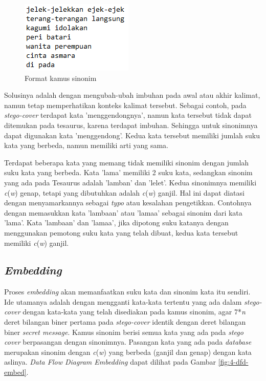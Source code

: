 \begin{figure}[H]
	\centering
	\includegraphics[scale=0.8]{Gambar/format-kamus}
	\caption{Format kamus sinonim} 
	\label{fig:6-format-kamus}
\end{figure}

Solusinya adalah dengan mengubah-ubah imbuhan pada awal atau akhir kalimat, namun tetap memperhatikan konteks kalimat tersebut. Sebagai contoh, pada \textit{stego-cover} terdapat kata 'menggendongnya', namun kata tersebut tidak dapat ditemukan pada tesaurus, karena terdapat imbuhan. Sehingga untuk sinonimnya dapat digunakan kata 'menggendong'. Kedua kata tersebut memiliki jumlah suku kata yang berbeda, namun memiliki arti yang sama.

Terdapat beberapa kata yang memang tidak memiliki sinonim dengan jumlah suku kata yang berbeda. Kata 'lama' memiliki 2 suku kata, sedangkan sinonim yang ada pada Tesaurus adalah 'lamban' dan 'lelet'. Kedua sinonimnya memiliki \textit{c}(\textit{w}) genap, tetapi yang dibutuhkan adalah \textit{c}(\textit{w}) ganjil. Hal ini dapat diatasi dengan menyamarkannya sebagai \textit{typo} atau kesalahan pengetikkan. Contohnya dengan memasukkan kata 'lambaan' atau 'lamaa' sebagai sinonim dari kata 'lama'. Kata 'lambaan' dan 'lamaa', jika dipotong suku katanya dengan menggunakan pemotong suku kata yang telah dibuat, kedua kata tersebut memiliki \textit{c}(\textit{w}) ganjil.

\subsection{\textit{Embedding}}
Proses \textit{embedding} akan memanfaatkan suku kata dan sinonim kata itu sendiri. Ide utamanya adalah dengan mengganti kata-kata tertentu yang ada dalam \textit{stego-cover} dengan kata-kata yang telah disediakan pada kamus sinonim, agar 7*\textit{n} deret bilangan biner pertama pada \textit{stego-cover} identik dengan deret bilangan biner \textit{secret message}. Kamus sinonim berisi semua kata yang ada pada \textit{stego cover} berpasangan dengan sinonimnya. Pasangan kata yang ada pada \textit{database} merupakan sinonim dengan \textit{c}(\textit{w}) yang berbeda (ganjil dan genap) dengan kata aslinya. \textit{Data Flow Diagram Embedding} dapat dilihat pada Gambar \ref{fig:4-dfd-embed}.

